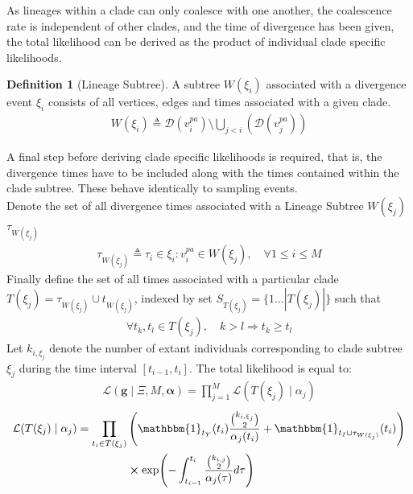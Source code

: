 \documentclass{ieeeaccess}
\theoremstyle{definition}
\newtheorem{definition}{Definition}[section]
\begin{document}
As lineages within a clade can only coalesce with one another, the coalescence rate is independent of other clades, and the time of divergence has been given, the total likelihood can be derived as the product of individual clade specific likelihoods.
\begin{definition}[Lineage Subtree]
A subtree $W(\xi_i)$ associated with a divergence event $\xi_i$ consists of all vertices, edges and times associated with a given clade.
\begin{gather}
W(\xi_i) \triangleq \mathcal{D}(v^{pa}_i) \setminus \bigcup_{j<i}(\mathcal{D}(v^{pa}_j))
\end{gather} 
\end{definition}
A final step before deriving clade specific likelihoods is required, that is, the divergence times have to be included along with the times contained within the clade subtree. These behave identically to sampling events.\\

Denote the set of all divergence times associated with a Lineage Subtree $W(\xi_j)$ $\tau_{W(\xi_j)}$
\begin{gather*}
\tau_{W(\xi_j)} \triangleq \tau_i \in \xi_i : v^{pa}_i \in W(\xi_j), \quad \forall 1\leq i\leq M
\end{gather*}
Finally define the set of all times associated with a particular clade
$T(\xi_j) = \tau_{W(\xi_j)}\cup t_{W(\xi_j)}$, indexed by set $S_{T(\xi_j)}=\{1 ... |T(\xi_j)|\}$ such that
\begin{gather*}
\forall t_k, t_l \in T(\xi_j),\quad k>l \Rightarrow t_k \geq t_l
\end{gather*}
Let $k_{i,\xi_j}$ denote the number of extant individuals corresponding to clade subtree  $\xi_j$ during the time interval $[t_{i-1}, t_i]$.
The total likelihood is equal to:
\begin{gather}
\mathcal{L}(\mathbf{g}\mid \Xi, M, \mathbf{\alpha}) = \prod_{j=1}^{M}\mathcal{L}(T(\xi_j) \mid \alpha_j) 
\end{gather}
\begin{gather}
\begin{aligned}
\mathcal{L}(T(\xi_j) \mid \alpha_j) = \prod_{t_i\in T(\xi_j)}&\left(\mathbbm{1}_{t_Y}(t_i) \frac{\binom{k_{i,\xi_j}}{2}}{\alpha_j(t_i)}+\mathbbm{1}_{t_I\cup\tau_{W(\xi_j)}}(t_i)\right)\\
&\cross\exp(-\int_{t_{i-1}}^{t_i}\frac{\binom{k_{i,j}}{2}}{\alpha_j(\tau)}d\tau)
\end{aligned}
\end{gather}
\end{document}
